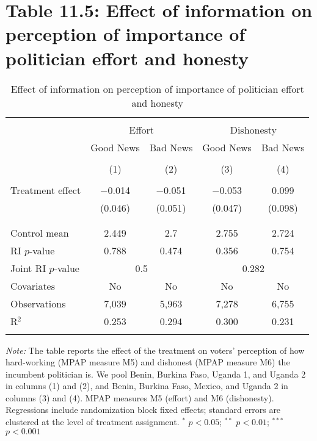 \documentclass[]{article}
\begin{document}
\clearpage

\section{Table 11.5: Effect of information on perception of importance
of politician effort and
honesty}\label{table-11.5-effect-of-information-on-perception-of-importance-of-politician-effort-and-honesty}

\begin{table}[!htbp] \centering 
  \caption{Effect of information on perception of importance of politician effort and honesty} 
  \label{effort_honesty} 
\begin{tabular}{@{\extracolsep{1pt}}lcccc} 
\\[-1.8ex]\hline 
\hline \\[-1.8ex] 
 & \multicolumn{2}{c}{Effort}&\multicolumn{2}{c}{Dishonesty} \\ 
\cline{2-5} 
 & Good News & Bad News & Good News & Bad News \\ 
\\[-1.8ex] & (1) & (2) & (3) & (4)\\ 
\hline \\[-1.8ex] 
 Treatment effect & $-$0.014 & $-$0.051 & $-$0.053 & 0.099 \\ 
  & (0.046) & (0.051) & (0.047) & (0.098) \\ 
  & & & & \\ 
\hline \\[-1.8ex] 
Control mean & 2.449 & 2.7 & 2.755 & 2.724 \\ 
RI $p$-value & 0.788 & 0.474 & 0.356 & 0.754 \\ 
Joint RI $p$-value & \multicolumn{2}{c}{0.5} & \multicolumn{2}{c}{0.282} \\
Covariates & No & No & No & No \\ 
Observations & 7,039 & 5,963 & 7,278 & 6,755 \\ 
R$^{2}$ & 0.253 & 0.294 & 0.300 & 0.231 \\ 
\hline 
\hline \\[-1.8ex] 
\end{tabular} 
\begin{flushleft}\textit{Note:} The table reports the effect of the treatment on voters' perception of how hard-working (MPAP measure M5) and dishonest (MPAP measure M6) the incumbent politician is. We pool Benin, Burkina Faso, Uganda 1, and Uganda 2 in columns (1) and (2), and Benin, Burkina Faso, Mexico, and Uganda 2 in columns (3) and (4). MPAP measures M5 (effort) and M6 (dishonesty). Regressions include randomization block fixed effects; standard errors are clustered at the level of treatment assignment. $^{*}$ $p<0.05$; $^{**}$ $p<0.01$; $^{***}$ $p<0.001$ \end{flushleft}
\end{table}
\end{document}
